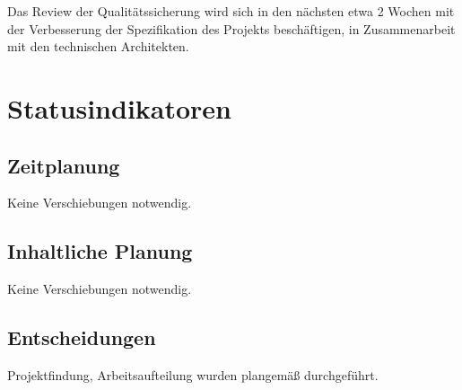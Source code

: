 Das Review der Qualitätssicherung wird sich in den nächsten etwa 2 Wochen mit
der Verbesserung der Spezifikation des Projekts beschäftigen, in Zusammenarbeit
mit den technischen Architekten.

\section{Statusindikatoren}

\subsection{Zeitplanung}
Keine Verschiebungen notwendig.

\subsection{Inhaltliche Planung}
Keine Verschiebungen notwendig.

\subsection{Entscheidungen}
Projektfindung, Arbeitsaufteilung wurden plangemäß durchgeführt.


